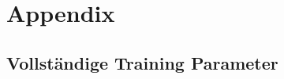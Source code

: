 \chapter*{Appendix}\label{ch:appendix}

\section{Vollständige Training Parameter}\label{app:sec:trainingpaameter}